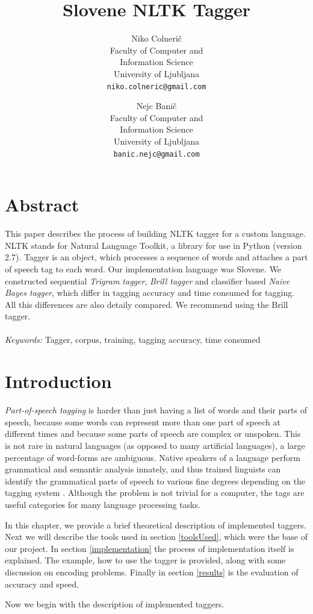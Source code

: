 \documentclass[10pt, conference, compsocconf]{IEEEtran}
\title{Slovene NLTK Tagger}
\author{
	Niko Colnerič \\
	\footnotesize Faculty of Computer and \\
	\footnotesize Information Science \\
	\footnotesize University of Ljubljana \\
	\footnotesize \texttt{niko.colneric@gmail.com} \\
	\and
	Nejc Banič \\
	\footnotesize Faculty of Computer and \\
	\footnotesize Information Science \\
	\footnotesize University of Ljubljana \\
	\footnotesize \texttt{banic.nejc@gmail.com} \\
}
\begin{document}
\maketitle
\thispagestyle{empty}

\section*{Abstract} %
This paper describes the process of building NLTK tagger for a custom language. NLTK stands for Natural Language Toolkit, a library for use in Python (version 2.7).
Tagger is an object, which processes a sequence of words and attaches a part of speech tag to each word.
Our implementation language was Slovene.
We constructed sequential \textit{Trigram tagger}, \textit{Brill tagger} and classifier based \textit{Naive Bayes tagger}, which differ in tagging accuracy and time consumed for tagging. All this differences are also detaily compared. We recommend using the Brill tagger. 
\\\\
\textit{Keywords:} Tagger, corpus, training, tagging accuracy, time consumed

\section{Introduction} %
\textit{Part-of-speech tagging} is harder than just having a list of words and their parts of speech, because some words can represent more than one part of speech at different times and because some parts of speech are complex or unspoken. This is not rare in natural languages (as opposed to many artificial languages), a large percentage of word-forms are ambiguous. Native speakers of a language perform grammatical and semantic analysis innately, and thus trained linguists can identify the grammatical parts of speech to various fine degrees depending on the tagging system \cite{wiki}. Although the problem is not trivial for a computer, the tags are useful categories for many language processing tasks. 
\par
In this chapter, we provide a brief theoretical description of implemented taggers. Next we will describe the tools used in section \ref{toolsUsed}, which were the base of our project. In section \ref{implementation} the process of implementation itself is explained. The example, how to use the tagger is provided, along with some discussion on encoding problems. Finally in section \ref{results} is the evaluation of accuracy and speed.
\par
Now we begin with the description of implemented taggers.
\end{document}
